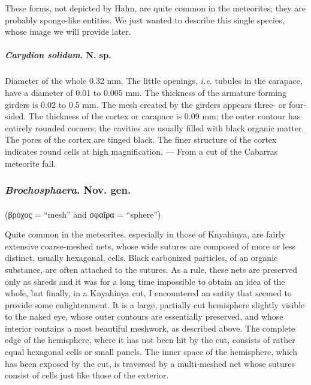 \documentclass[a4paper, 12pt, oneside]{article}
\begin{document}
These forms, not depicted by Hahn, are quite common in the meteorites; they are probably sponge-like entities. We just wanted to describe this single species, whose image we will provide later.
\paragraph{\emph{Carydion solidum}. N. sp.}
\subparagraph{}
Diameter of the whole 0.32 mm. The little openings, \emph{i.e.} tubules in the carapace, have a diameter of 0.01 to 0.005 mm. The thickness of the armature forming girders is 0.02 to 0.5 mm. The mesh created by the girders appears three- or four-sided. The thickness of the cortex or carapace is 0.09 mm; the outer contour has entirely rounded corners; the cavities are usually filled with black organic matter. The pores of the cortex are tinged black. The finer structure of the cortex indicates round cells at high magnification. --- From a cut of the Cabarras meteorite fall.
\subsubsection{\emph{Brochosphaera}. Nov. gen.}
\paragraph*{}
(βρόχος = ``mesh'' and σφαῖρα = ``sphere'')%

Quite common in the meteorites, especially in those of Knyahinya, are fairly extensive coarse-meshed nets, whose wide sutures are composed of more or less distinct, usually hexagonal, cells. Black carbonized particles, of an organic substance, are often attached to the sutures. As a rule, these nets are preserved only as shreds and it was for a long time impossible to obtain an idea of the whole, but finally, in a Knyahinya cut, I encountered an entity that seemed to provide some enlightenment. It is a large, partially cut hemisphere slightly visible to the naked eye, whose outer contours are essentially preserved, and whose interior contains a most beautiful meshwork, as described above. The complete edge of the hemisphere, where it has not been hit by the cut, consists of rather equal hexagonal cells or small panels. The inner space of the hemisphere, which has been exposed by the cut, is traversed by a multi-meshed net whose sutures consist of cells just like those of the exterior.
\end{document}
